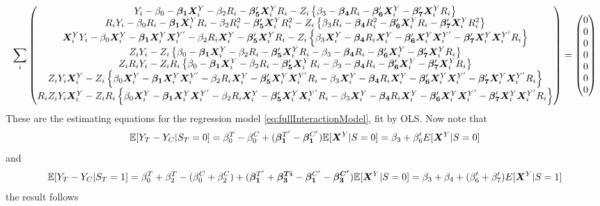 \documentclass[11pt]{article} %
\begin{document}
\begin{equation*}
  \displaystyle\sum_i \begin{pmatrix}
    Y_i-\beta_0-\bm{\beta_1}\bm{X}^Y_i-\beta_2R_i-\bm{\beta_5}'\bm{X}^Y_iR_i-Z_i\left\{\beta_3-\bm{\beta_4}R_i-\bm{\beta_6}'\bm{X}^Y_i-\bm{\beta_7}'\bm{X}^Y_i R_i\right\}\\
    R_iY_i-\beta_0R_i-\bm{\beta_1}\bm{X}^Y_i R_i-\beta_2R_i^2-\bm{\beta_5}'\bm{X}^Y_iR_i^2-Z_i\left\{\beta_3R_i-\bm{\beta_4}R_i^2-\bm{\beta_6}'\bm{X}^Y_iR_i-\bm{\beta_7}'\bm{X}^Y_i R_i^2\right\}\\
    \bm{X}^Y_i Y_i-\beta_0\bm{X}^Y_i-\bm{\beta_1}\bm{X}^Y_i\bm{X}^{Y'}_i-\beta_2R_i\bm{X}^Y_i-\bm{\beta_5}'\bm{X}^Y_iR_i-Z_i\left\{\beta_3\bm{X}^Y_i-\bm{\beta_4}R_i\bm{X}^Y_i-\bm{\beta_6}'\bm{X}^Y_i\bm{X}^{Y'}_i-\bm{\beta_7}'\bm{X}^Y_i\bm{X}^{Y'}_i R_i\right\}\\
    Z_iY_i-Z_i\left\{\beta_0-\bm{\beta_1}\bm{X}^Y_i-\beta_2R_i-\bm{\beta_5}'\bm{X}^Y_iR_i-\beta_3-\bm{\beta_4}R_i-\bm{\beta_6}'\bm{X}^Y_i-\bm{\beta_7}'\bm{X}^Y_i R_i\right\}\\
    Z_iR_iY_i-Z_iR_i\left\{\beta_0-\bm{\beta_1}\bm{X}^Y_i-\beta_2R_i-\bm{\beta_5}'\bm{X}^Y_iR_i-\beta_3-\bm{\beta_4}R_i-\bm{\beta_6}'\bm{X}^Y_i-\bm{\beta_7}'\bm{X}^Y_i R_i\right\}\\
    Z_iY_i\bm{X}^Y_i-Z_i\left\{\beta_0\bm{X}^Y_i-\bm{\beta_1}\bm{X}^Y_i\bm{X}^{Y'}_i-\beta_2R_i\bm{X}^Y_i-\bm{\beta_5}'\bm{X}^Y_i\bm{X}^{Y'}_iR_i-\beta_3\bm{X}^Y_i-\bm{\beta_4}R_i\bm{X}^Y_i-\bm{\beta_6}'\bm{X}^Y_i\bm{X}^{Y'}_i-\bm{\beta_7}'\bm{X}^Y_i\bm{X}^{Y'}_i R_i\right\}\\
    R_iZ_iY_i\bm{X}^Y_i-Z_iR_i\left\{\beta_0\bm{X}^Y_i-\bm{\beta_1}\bm{X}^Y_i\bm{X}^{Y'}_i-\beta_2R_i\bm{X}^Y_i-\bm{\beta_5}'\bm{X}^Y_i\bm{X}^{Y'}_iR_i-\beta_3\bm{X}^Y_i-\bm{\beta_4}R_i\bm{X}^Y_i-\bm{\beta_6}'\bm{X}^Y_i\bm{X}^{Y'}_i-\bm{\beta_7}'\bm{X}^Y_i\bm{X}^{Y'}_i R_i\right\}
  \end{pmatrix}=\begin{pmatrix} 0\\0\\0\\0\\0\\0\\0\end{pmatrix}
\end{equation*}
These are the estimating equations for the regression model \eqref{eq:fullInteractionModel}, fit by OLS. Now note that
\begin{equation*}
  \mathbb{E}[Y_T-Y_C|S_T=0]=\beta_0^T-\beta_0^C+(\bm{\beta_1}^{T'}-\bm{\beta_1}^{C'})\mathbb{E}[\bm{X}^Y|S=0]=\beta_3+\beta_6'E[\bm{X}^Y|S=0]
\end{equation*}
and
\begin{equation*}
  \mathbb{E}[Y_T-Y_C|S_T=1]=\beta_0^T+\beta_2^T-(\beta_0^C+\beta_2^C)+(\bm{\beta_1}^{T'}+\bm{\beta_3^{Ti}}-\bm{\beta_1}^{C'}-\bm{\beta_3^{C'}})\mathbb{E}[\bm{X}^Y|S=0]=\beta_3+\beta_4+(\beta_6'+\beta_7')E[\bm{X}^Y|S=1]
\end{equation*}
the result follows
\end{document}
